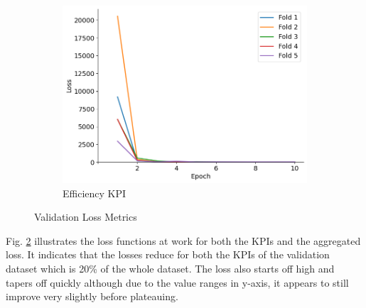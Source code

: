 \documentclass{report} %
\begin{document}
\begin{figure}[H]
\begin{subfigure}{0.32\textwidth}
        \centering
        \includegraphics[width=\textwidth]{./ReportImages/val_loss_y2.png}
        \caption{\centering Efficiency \ac{KPI}}
        \label{fig:Validation Loss for Efficiency grid}
    \end{subfigure}
    \caption{Validation Loss Metrics}
    \label{fig:Validation Loss Metrics}
\end{figure}

Fig. \ref{fig:Validation Loss Metrics} illustrates the loss functions at work for both the \ac{KPI}s and the aggregated loss.
It indicates that the losses reduce for both the \ac{KPI}s of the validation dataset which is 20\% of the whole dataset.
The loss also starts off high and tapers off quickly although due to the value ranges in y-axis, it appears to still improve very slightly before plateauing.
\end{document}
